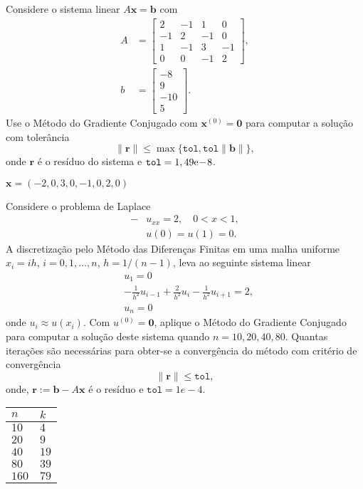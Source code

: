 \begin{exer}
  Considere o sistema linear $A\pmb{x} = \pmb{b}$ com
  \begin{align}
    A &=
    \begin{bmatrix}
      2 & -1 & 1 & 0\\
      -1 & 2 & -1 & 0\\
      1 & -1 & 3 & -1 \\
      0 & 0 & -1 & 2
    \end{bmatrix},\\
    b &=
    \begin{bmatrix}
      -8\\
      9\\
      -10\\
      5
    \end{bmatrix}.
  \end{align}
  Use o Método do Gradiente Conjugado com $\pmb{x}^{(0)} = \pmb{0}$ para computar a solução com tolerância
  \begin{equation}
    \|\pmb{r}\| \leq \max\{\texttt{tol}, \texttt{tol}\|\pmb{b}\|\},
  \end{equation}
  onde $\pmb{r}$ é o resíduo do sistema e $\texttt{tol} = 1,49\mathrm{e}\!-\!8$.
\end{exer}
\begin{resp}
  $\pmb{x} = \left(-2,0, 3,0, -1,0, 2,0\right)$
\end{resp}

\begin{exer}
  Considere o problema de Laplace
  \begin{align}
    -&u_{xx} = 2,\quad 0 < x < 1,\\
     &u(0) = u(1) = 0.
  \end{align}
  A discretização pelo Método das Diferenças Finitas em uma malha uniforme $x_i = ih$, $i=0,1,\dotsc,n$, $h=1/(n-1)$, leva ao seguinte sistema linear
  \begin{align}
    &u_1 = 0\\
    &-\frac{1}{h^2}u_{i-1} + \frac{2}{h^2}u_{i} - \frac{1}{h^2}u_{i+1} = 2,\\
    &u_n = 0
  \end{align}
  onde $u_i \approx u(x_i)$. Com $u^{(0)} = \pmb{0}$, aplique o Método do Gradiente Conjugado para computar a solução deste sistema quando $n=10, 20, 40, 80$. Quantas iterações são necessárias para obter-se a convergência do método com critério de convergência
  \begin{equation}
    \|\pmb{r}\| \leq \texttt{tol},
  \end{equation}
  onde, $\pmb{r} := \pmb{b} - A\pmb{x}$ é o resíduo e $\texttt{tol} = 1e-4$.
\end{exer}
\begin{resp}
  \begin{tabular}{ll}
    $n$ & $k$\\\hline
    $10$ & $4$\\
    $20$ & $9$\\
    $40$ & $19$\\
    $80$ & $39$\\
    $160$ & $79$
  \end{tabular}
\end{resp}

